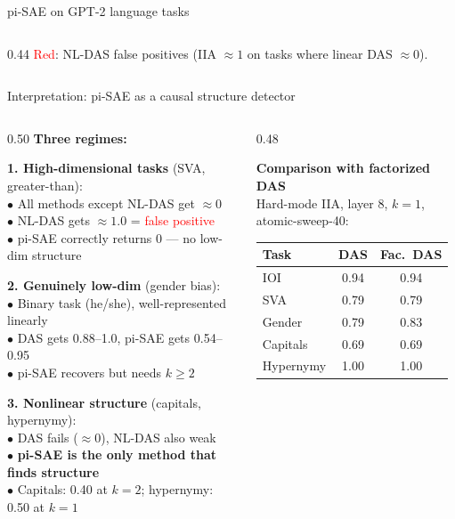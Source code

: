 \documentclass[aspectratio=169,11pt]{beamer}
\begin{document}
\begin{frame}{pi-SAE on GPT-2 language tasks}
\begin{columns}[T]
\begin{column}{0.44\textwidth}
\vspace{0.3em}
{\scriptsize \textcolor{red}{Red}: NL-DAS false positives (IIA $\approx 1$ on tasks where linear DAS $\approx 0$).}
\end{column}
\end{columns}
\end{frame}

\begin{frame}{Interpretation: pi-SAE as a causal structure detector}

\begin{columns}[T]
\begin{column}{0.50\textwidth}
\textbf{Three regimes:}

\vspace{0.3em}
{\small \textbf{1. High-dimensional tasks} (SVA, greater-than):}\\
{\small $\bullet$ All methods except NL-DAS get $\approx 0$\\
$\bullet$ NL-DAS gets $\approx 1.0$ = \textcolor{red}{false positive}\\
$\bullet$ pi-SAE correctly returns 0 --- no low-dim structure}

\vspace{0.3em}
{\small \textbf{2. Genuinely low-dim} (gender bias):}\\
{\small $\bullet$ Binary task (he/she), well-represented linearly\\
$\bullet$ DAS gets 0.88--1.0, pi-SAE gets 0.54--0.95\\
$\bullet$ pi-SAE recovers but needs $k \geq 2$}

\vspace{0.3em}
{\small \textbf{3. Nonlinear structure} (capitals, hypernymy):}\\
{\small $\bullet$ DAS fails ($\approx 0$), NL-DAS also weak\\
$\bullet$ \textbf{pi-SAE is the only method that finds structure}\\
$\bullet$ Capitals: 0.40 at $k{=}2$; hypernymy: 0.50 at $k{=}1$}
\end{column}
\begin{column}{0.48\textwidth}

\vspace{0.5em}
\textbf{Comparison with factorized DAS}\\[0.3em]
{\scriptsize Hard-mode IIA, layer 8, $k{=}1$, atomic-sweep-40:}

\vspace{0.2em}
{\scriptsize\centering
\renewcommand{\arraystretch}{1.15}
\begin{tabular}{l|cc}
\toprule
\textbf{Task} & \textbf{DAS} & \textbf{Fac.\ DAS} \\
\midrule
IOI       & 0.94 & 0.94 \\
SVA       & 0.79 & 0.79 \\
Gender    & 0.79 & 0.83 \\
Capitals  & 0.69 & 0.69 \\
Hypernymy & 1.00 & 1.00 \\
\bottomrule
\end{tabular}
}


\end{column}
\end{columns}
\end{frame}
\end{document}
